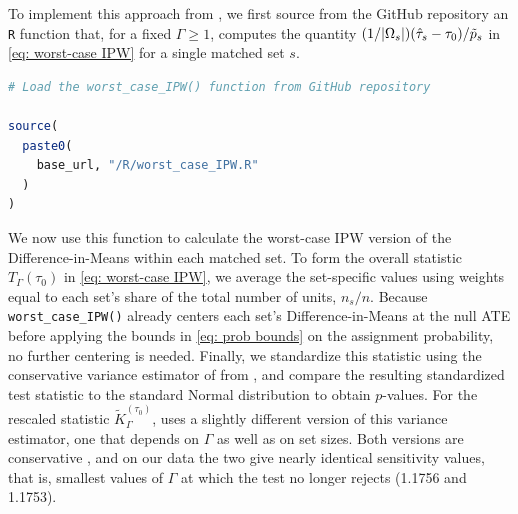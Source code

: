 \documentclass[twoside,11pt]{article}
\DeclarePairedDelimiter\abs{\lvert}{\rvert}
\begin{document}
To implement this approach from \citet{fogarty2023}, we first source
from the GitHub repository an \texttt{R} function that, for a fixed
\(\Gamma \geq 1\), computes the quantity
\((1/\abs{\Omega_s})(\hat{\tau}_s - \tau_0)/\tilde{p}_s\) in
\eqref{eq: worst-case IPW} for a single matched set \(s\).



\begin{lstlisting}[language=R]
# Load the worst_case_IPW() function from GitHub repository

source(
  paste0(
    base_url, "/R/worst_case_IPW.R"
  )
)
\end{lstlisting}



We now use this function to calculate the worst-case IPW version of the
Difference-in-Means within each matched set. To form the overall
statistic \(T_{\Gamma}(\tau_0)\) in \eqref{eq: worst-case IPW}, we average the set-specific values using weights equal to
each set's share of the total number of units, \(n_s/n\). Because
\texttt{worst\_case\_IPW()} already centers each set's
Difference-in-Means at the null ATE before applying the bounds in
\eqref{eq: prob bounds} on the assignment probability, no further
centering is needed. Finally, we standardize this statistic using the
conservative variance estimator of \citet{fogarty2018} from
, and compare the
resulting standardized test statistic to the standard Normal distribution
to obtain \(p\)-values. For the rescaled statistic
\(\tilde{K}_{\Gamma}^{(\tau_0)}\), \citet[p.~2202]{fogarty2023} uses a
slightly different version of this variance estimator, one that depends
on \(\Gamma\) as well as on set sizes. Both versions are conservative
\citep[Proposition~1]{fogarty2018}, and on our data the two give nearly
identical sensitivity values, that is, smallest values of \(\Gamma\) at which the test no longer rejects (1.1756 and 1.1753).
\end{document}
